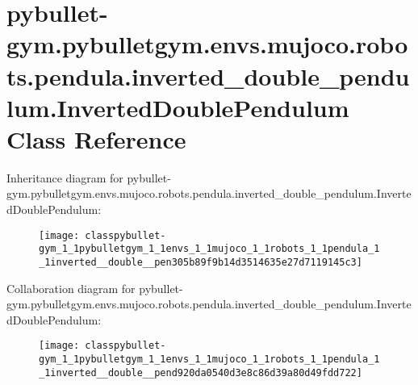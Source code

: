 \hypertarget{classpybullet-gym_1_1pybulletgym_1_1envs_1_1mujoco_1_1robots_1_1pendula_1_1inverted__double__penb7cabeef1e6b20f22de17739c38bbed3}{}\section{pybullet-\/gym.pybulletgym.\+envs.\+mujoco.\+robots.\+pendula.\+inverted\+\_\+double\+\_\+pendulum.\+Inverted\+Double\+Pendulum Class Reference}
\label{classpybullet-gym_1_1pybulletgym_1_1envs_1_1mujoco_1_1robots_1_1pendula_1_1inverted__double__penb7cabeef1e6b20f22de17739c38bbed3}


Inheritance diagram for pybullet-\/gym.pybulletgym.\+envs.\+mujoco.\+robots.\+pendula.\+inverted\+\_\+double\+\_\+pendulum.\+Inverted\+Double\+Pendulum\+:
\nopagebreak
\begin{figure}[H]
\begin{center}
\leavevmode
\texttt{[image: classpybullet-gym\_1\_1pybulletgym\_1\_1envs\_1\_1mujoco\_1\_1robots\_1\_1pendula\_1\_1inverted\_\_double\_\_pen305b89f9b14d3514635e27d7119145c3]}
\end{center}
\end{figure}


Collaboration diagram for pybullet-\/gym.pybulletgym.\+envs.\+mujoco.\+robots.\+pendula.\+inverted\+\_\+double\+\_\+pendulum.\+Inverted\+Double\+Pendulum\+:
\nopagebreak
\begin{figure}[H]
\begin{center}
\leavevmode
\texttt{[image: classpybullet-gym\_1\_1pybulletgym\_1\_1envs\_1\_1mujoco\_1\_1robots\_1\_1pendula\_1\_1inverted\_\_double\_\_pend920da0540d3e8c86d39a80d49fdd722]}
\end{center}
\end{figure}
